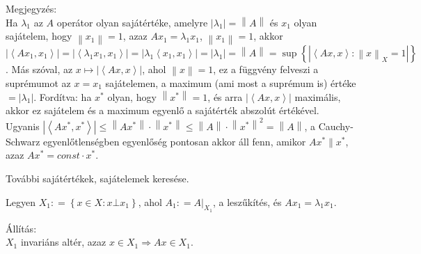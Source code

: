 \documentclass[12pt,a4paper]{scrartcl}
\newenvironment{allitas}{}{}
\newenvironment{megjegyzes}{}{}
\begin{document}
\begin{megjegyzes}

Megjegyzés:\\
Ha \(\lambda_{1}\) az \(A\) operátor olyan sajátértéke, amelyre
\(\left| \lambda_{1} \right| = \left\| A \right\|\) és \(x_{1}\) olyan
sajátelem, hogy \(\left\| x_{1} \right\| = 1\), azaz
\(Ax_{1} = \lambda_{1}x_{1}\), \(\left\| x_{1} \right\| = 1\), akkor
\(\left| \left\langle {Ax_{1},x_{1}} \right\rangle \right| = \left| \left\langle {\lambda_{1}x_{1},x_{1}} \right\rangle \right| = \left| {\lambda_{1}\left\langle {x_{1},x_{1}} \right\rangle} \right| = \left| \lambda_{1} \right| = \left\| A \right\| = \sup\left\{ \left| {\left\langle {Ax,x} \right\rangle:\left\| x \right\|_{X} = 1} \right| \right\}\).
Más szóval, az
\(\left. x\mapsto\left| \left\langle {Ax,x} \right\rangle \right| \right.\),
ahol \(\left\| x \right\| = 1\), ez a függvény felveszi a suprémumot az
\(x = x_{1}\) sajátelemen, a maximum (ami most a suprémum is) értéke
\(= \left| \lambda_{1} \right|\). Fordítva: ha \(x^{*}\) olyan, hogy
\(\left\| x^{*} \right\| = 1\), és arra
\(\left| \left\langle {Ax,x} \right\rangle \right|\) maximális, akkor ez
sajátelem és a maximum egyenlő a sajátérték abszolút értékével. Ugyanis
\(\left| \left\langle {Ax^{*},x^{*}} \right\rangle \right| \leq \left\| {Ax^{*}} \right\| \cdot \left\| x^{*} \right\| \leq \left\| A \right\| \cdot \left\| x^{*} \right\|^{2} = \left\| A \right\|\),
a Cauchy-Schwarz egyenlőtlenségben egyenlőség pontosan akkor áll fenn,
amikor \(Ax^{*} \parallel x^{*}\), azaz \(Ax^{*} = const \cdot x^{*}\).

\end{megjegyzes}

További sajátértékek, sajátelemek keresése.

Legyen \(X_{1}: = \left\{ {x \in X:x\bot x_{1}} \right\}\), ahol
\(A_{1}: = \left. A \right|_{X_{1}}\), a leszűkítés, és
\(Ax_{1} = \lambda_{1}x_{1}\).

\begin{allitas}

Állítás:\\
\(X_{1}\) invariáns altér, azaz
\(\left. x \in X_{1}\Rightarrow Ax \in X_{1} \right.\).

\end{allitas}
\end{document}
